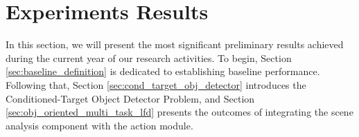 \section{Experiments Results}
\label{sec:experiment_results}
In this section, we will present the most significant preliminary results achieved during the current year of our research activities. To begin, Section \ref{sec:baseline_definition} is dedicated to establishing baseline performance. Following that, Section \ref{sec:cond_target_obj_detector} introduces the Conditioned-Target Object Detector Problem, and Section \ref{sec:obj_oriented_multi_task_lfd} presents the outcomes of integrating the scene analysis component with the action module.





